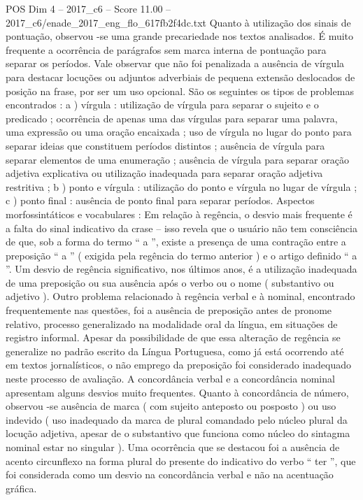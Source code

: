 \begin{textsample}{POS Dim 4 – 2017\_c6 – Score 11.00 – 2017\_c6/enade\_2017\_eng\_flo\_617fb2f4dc.txt}
Quanto à utilização dos sinais de pontuação, observou -se uma grande precariedade nos textos analisados.
É muito frequente a ocorrência de parágrafos sem marca interna de pontuação para separar os períodos.
Vale observar que não foi penalizada a ausência de vírgula para destacar locuções ou adjuntos adverbiais de pequena extensão deslocados de posição na frase, por ser um uso opcional.
São os seguintes os tipos de problemas encontrados : a ) vírgula : utilização de vírgula para separar o sujeito e o predicado ; ocorrência de apenas uma das vírgulas para separar uma palavra, uma expressão ou uma oração encaixada ; uso de vírgula no lugar do ponto para separar ideias que constituem períodos distintos ; ausência de vírgula para separar elementos de uma enumeração ; ausência de vírgula para separar oração adjetiva explicativa ou utilização inadequada para separar oração adjetiva restritiva ; b ) ponto e vírgula : utilização do ponto e vírgula no lugar de vírgula ; c ) ponto final : ausência de ponto final para separar períodos.
Aspectos morfossintáticos e vocabulares : Em relação à regência, o desvio mais frequente é a falta do sinal indicativo da crase – isso revela que o usuário não tem consciência de que, sob a forma do termo “ a ”, existe a presença de uma contração entre a preposição “ a ” ( exigida pela regência do termo anterior ) e o artigo definido “ a ”.
Um desvio de regência significativo, nos últimos anos, é a utilização inadequada de uma preposição ou sua ausência após o verbo ou o nome ( substantivo ou adjetivo ).
Outro problema relacionado à regência verbal e à nominal, encontrado frequentemente nas questões, foi a ausência de preposição antes de pronome relativo, processo generalizado na modalidade oral da língua, em situações de registro informal.
Apesar da possibilidade de que essa alteração de regência se generalize no padrão escrito da Língua Portuguesa, como já está ocorrendo até em textos jornalísticos, o não emprego da preposição foi considerado inadequado neste processo de avaliação.
A concordância verbal e a concordância nominal apresentam alguns desvios muito frequentes.
Quanto à concordância de número, observou -se ausência de marca ( com sujeito anteposto ou posposto ) ou uso indevido ( uso inadequado da marca de plural comandado pelo núcleo plural da locução adjetiva, apesar de o substantivo que funciona como núcleo do sintagma nominal estar no singular ).
Uma ocorrência que se destacou foi a ausência de acento circunflexo na forma plural do presente do indicativo do verbo “ ter ”, que foi considerada como um desvio na concordância verbal e não na acentuação gráfica.

\end{textsample}
